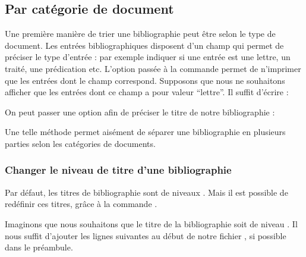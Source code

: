 \subsection{Par catégorie de document}
Une première manière de trier une bibliographie peut être selon le type de document. Les entrées bibliographiques disposent d'un champ  qui permet de préciser le type d'entrée : par exemple indiquer si une entrée est une lettre, un traité, une prédication etc. L'option  passée à la commande  permet de n'imprimer que les entrées dont le champ  correspond. Supposons que nous ne souhaitons afficher que les entrées dont ce champ  a pour valeur \enquote{lettre}. Il suffit d'écrire :

\begin{latexcode}
\printbibliography[subtype=lettre]
\end{latexcode}

On peut passer une option  afin de préciser le titre de notre bibliographie :

\begin{latexcode}
\printbibliography[subtype=lettre,title=Lettres]
\end{latexcode}

Une telle méthode permet aisément de séparer une bibliographie en plusieurs parties selon les catégories de documents.

\begin{latexcode}
\printbibliography[subtype=concile,title=Actes de conciles]
\printbibliography[subtype=traite,title=Traités]
\printbibliography[subtype=lettre,title=Lettres]
\end{latexcode}


\subsubsection{Changer le niveau de titre d'une bibliographie}

Par défaut, les titres de bibliographie sont de niveaux . Mais il est possible de redéfinir ces titres, grâce à la commande .

Imaginons que nous souhaitons que le titre de la bibliographie soit de niveau . Il nous suffit d'ajouter les lignes suivantes au début de notre fichier , si possible dans le préambule.


